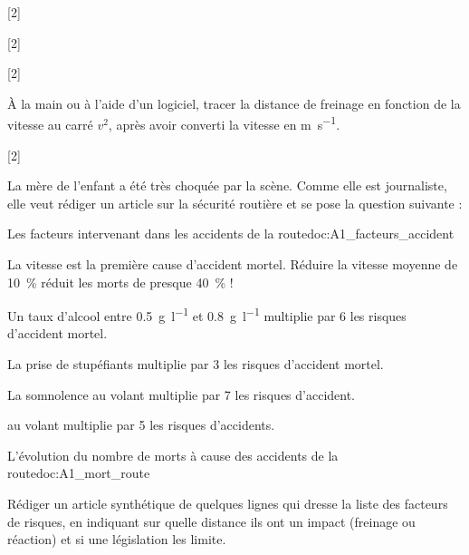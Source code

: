 [2]

[2]

\newpage
\vspace*{-30pt}
[2]

\mesure
À la main ou à l'aide d'un logiciel, tracer la distance de freinage en fonction de la vitesse au carré $v^2$, après avoir converti la vitesse en \unit{\m\per\s}.

[2]


\begin{contexte}
  La mère de l'enfant a été très choquée par la scène.
  Comme elle est journaliste, elle veut rédiger un article sur la sécurité routière et se pose la question suivante :
  
\end{contexte}

\begin{doc}{Les facteurs intervenant dans les accidents de la route}{doc:A1_facteurs_accident}
  \begin{listePoints}[2]
    \item La vitesse est la première cause d'accident mortel.
    Réduire la vitesse moyenne de \qty{10}{\percent} réduit les morts de presque \qty{40}{\percent} !
    \item Un taux d'alcool entre \qty{0,5}{\g\per\litre} et \qty{0,8}{\g\per\litre} multiplie par 6 les risques d'accident mortel.
    \item La prise de stupéfiants multiplie par 3 les risques d'accident mortel.
    \item La somnolence au volant multiplie par 7 les risques d'accident.
    \item {} au volant multiplie par 5 les risques d'accidents.
  \end{listePoints}
\end{doc}


\begin{doc}{L'évolution du nombre de morts à cause des accidents de la route}{doc:A1_mort_route}
  \centering
\end{doc}

\numeroQuestion
Rédiger un article synthétique de quelques lignes qui dresse la liste des facteurs de risques, en indiquant sur quelle distance ils ont un impact (freinage ou réaction) et si une législation les limite.
